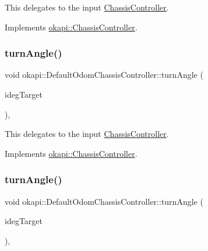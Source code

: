 This delegates to the input \mbox{\hyperlink{classokapi_1_1ChassisController}{Chassis\+Controller}}. 

Implements \mbox{\hyperlink{classokapi_1_1ChassisController_ac67edbbbe1c8480c4503b9875a3719cd}{okapi\+::\+Chassis\+Controller}}.

\mbox{\label{classokapi_1_1DefaultOdomChassisController_a4ba07ac4bea9ff2d8aea30be72f6a0ea}} 
\subsubsection{\texorpdfstring{turnAngle()}{turnAngle()}\hspace{0.1cm}{\footnotesize\ttfamily [1/2]}}
{\footnotesize\ttfamily void okapi\+::\+Default\+Odom\+Chassis\+Controller\+::turn\+Angle (\begin{DoxyParamCaption}\item[{Q\+Angle}]{ideg\+Target }\end{DoxyParamCaption})\hspace{0.3cm}{\ttfamily [override]}, {\ttfamily [virtual]}}

This delegates to the input \mbox{\hyperlink{classokapi_1_1ChassisController}{Chassis\+Controller}}. 

Implements \mbox{\hyperlink{classokapi_1_1ChassisController_aab12308b3fad6793c007d7a33730a3f7}{okapi\+::\+Chassis\+Controller}}.

\mbox{\label{classokapi_1_1DefaultOdomChassisController_a05a8a6684b3afe4f7c2ecbc24699f70d}} 
\subsubsection{\texorpdfstring{turnAngle()}{turnAngle()}\hspace{0.1cm}{\footnotesize\ttfamily [2/2]}}
{\footnotesize\ttfamily void okapi\+::\+Default\+Odom\+Chassis\+Controller\+::turn\+Angle (\begin{DoxyParamCaption}\item[{double}]{ideg\+Target }\end{DoxyParamCaption})\hspace{0.3cm}{\ttfamily [override]}, {\ttfamily [virtual]}}

